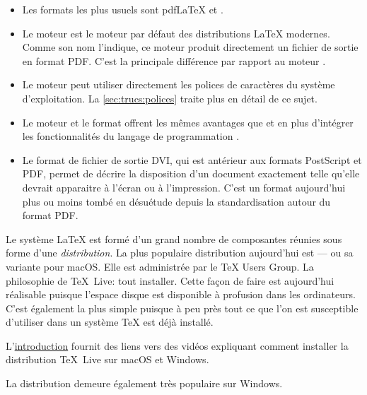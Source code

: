 \begin{itemize}
\item Les formats les plus usuels sont pdf{\LaTeX} et {\XeLaTeX}.
\item Le moteur  est le moteur par défaut des
  distributions {\LaTeX} modernes. Comme son nom l'indique, ce moteur
  produit directement un fichier de sortie en format PDF. C'est la
  principale différence par rapport au moteur .
\item Le moteur  peut utiliser directement les polices de
  caractères du système d'exploitation. La \autoref{sec:trucs:polices}
  traite plus en détail de ce sujet.
\item Le moteur  et le format {\LuaLaTeX} offrent les mêmes
  avantages que  et {\XeLaTeX} en plus d'intégrer les
  fonctionnalités du langage de programmation
  .
\item Le format de fichier de sortie DVI, qui est antérieur aux
  formats PostScript et PDF, permet de décrire la disposition d'un
  document exactement telle qu'elle devrait apparaitre à l'écran ou à
  l'impression. C'est un format aujourd'hui plus ou moins tombé en
  désuétude depuis la standardisation autour du format PDF.
\end{itemize}

Le système {\LaTeX} est formé d'un grand nombre de composantes réunies
sous forme d'une \emph{distribution}. La plus populaire distribution
aujourd'hui est %
--- ou sa variante %
pour macOS.
Elle est administrée par le {\TeX} Users Group. La philosophie de
{\TeX}~Live: tout installer. Cette façon de faire est aujourd'hui
réalisable puisque l'espace disque est disponible à profusion dans les
ordinateurs. C'est également la plus simple puisque à peu près tout ce
que l'on est susceptible d'utiliser dans un système {\TeX} est déjà
installé.

L'\hyperref[chap:introduction]{introduction} fournit des liens vers
des vidéos expliquant comment installer la distribution {\TeX}~Live
sur macOS et Windows.

La distribution %
demeure également très populaire sur Windows.

